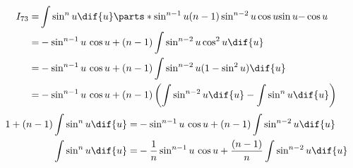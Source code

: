 \def\no{73}
\def\theintegral{\(\int\sin^n{u}\;\dif{u}
\enspace=\enspace%
-\tfrac{1}{n}\,\sin^{n-1}{u}\;\cos{u}
\,+\,
\tfrac{n-1}{n}\,\int\sin^{n-2}u\;\dif{u}
\)}

\begin{align*}
{I}_{\no}
=&  \int\sin^n{u}\dif{u}
\parts*
  { \sin^{n-1}u} {  (n-1)\sin^{n-2}{u}\cos{u}  }%
  { \sin u  }     {  -\cos u  } \\
=& -\sin^{n-1}{u}\,\cos{u} + (n-1)\int \sin^{n-2}{u}\cos^2{u}\dif{u}\\
=& -\sin^{n-1}{u}\,\cos{u} + (n-1)\int \sin^{n-2}{u}(1-\sin^2{u})\dif{u}\\
=& -\sin^{n-1}{u}\,\cos{u} + (n-1)
    \left(
        \int \sin^{n-2}{u}\dif{u} - \int \sin^{n}{u} \dif{u}
    \right)
\end{align*}
\begin{align*}
1+(n-1)\int\sin^n{u}\dif{u}
=& -\sin^{n-1}{u}\,\cos{u} + (n-1)\int \sin^{n-2}{u}\dif{u} \\
\int\sin^n{u}\dif{u}
=& -\frac{1}{n}\sin^{n-1}{u}\,\cos{u} + \frac{(n-1)}{n}\int \sin^{n-2}{u}\dif{u}
\end{align*}
